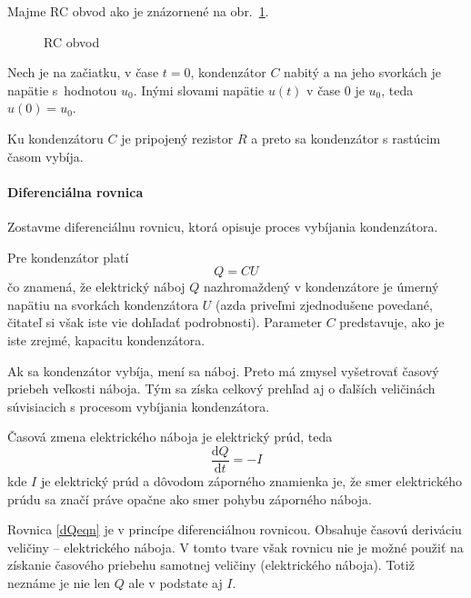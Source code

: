 \documentclass[a4paper, 10pt, ]{article}
\begin{document}
Majme RC obvod ako je znázornené na obr.~\ref{RCobvod}.

\begin{figure}[!t]
	\centering

	\makebox[\textwidth][c]{%
	
	}

	\caption{RC obvod}
	\label{RCobvod}
\end{figure}

Nech je na začiatku, v čase $t=0$, kondenzátor $C$ nabitý a na jeho svorkách je napätie s~hodnotou $u_0$. Inými slovami napätie $u(t)$ v čase $0$ je $u_0$, teda $u(0) = u_0$.

Ku kondenzátoru $C$ je pripojený rezistor $R$ a preto sa kondenzátor s rastúcim časom vybíja.


\paragraph{Diferenciálna rovnica}

Zostavme diferenciálnu rovnicu, ktorá opisuje proces vybíjania kondenzátora.


Pre kondenzátor platí
\begin{equation} \label{nabojDef}
    Q = CU
\end{equation}
čo znamená, že elektrický náboj $Q$ nazhromaždený v kondenzátore je úmerný napätiu na svorkách kondenzátora $U$ (azda priveľmi zjednodušene povedané, čitateľ si však iste vie dohľadať podrobnosti). Parameter $C$ predstavuje, ako je iste zrejmé, kapacitu kondenzátora.

Ak sa kondenzátor vybíja, mení sa náboj. Preto má zmysel vyšetrovať časový priebeh veľkosti náboja. Tým sa získa celkový prehľad aj o ďalších veličinách súvisiacich s procesom vybíjania kondenzátora.

Časová zmena elektrického náboja je elektrický prúd, teda
\begin{equation} \label{dQeqn}
    \frac{\text{d}Q}{\text{d}t} = - I
\end{equation}
kde $I$ je elektrický prúd a dôvodom záporného znamienka je, že smer elektrického prúdu sa značí práve opačne ako smer pohybu záporného náboja.

Rovnica \eqref{dQeqn} je v princípe diferenciálnou rovnicou. Obsahuje časovú deriváciu veličiny -- elektrického náboja. V tomto tvare však rovnicu nie je možné použiť na získanie časového priebehu samotnej veličiny (elektrického náboja). Totiž neznáme je nie len $Q$ ale v podstate aj $I$.
\end{document}
